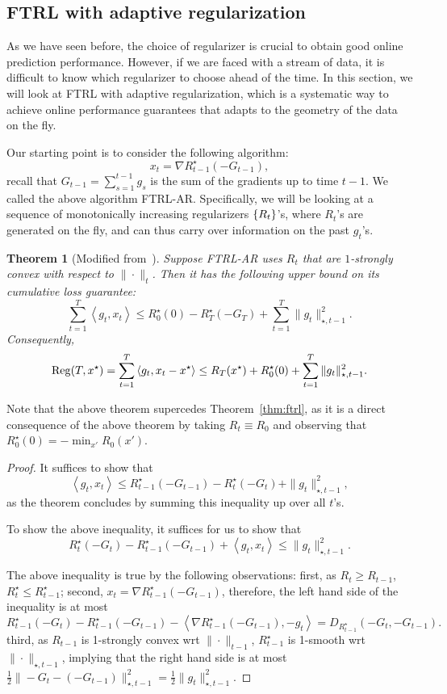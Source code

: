 \documentclass{article}
\newtheorem{theorem}{Theorem}
\DeclareMathOperator*{\Reg}{{\rm Reg}}
\newcommand{\inner}[2]{\left\langle #1,#2 \right\rangle}
\begin{document}
\subsection{FTRL with adaptive regularization}
As we have seen before, the choice of regularizer is crucial to obtain good online prediction performance. However, if we are faced with a stream of data, it is difficult to know which regularizer to choose ahead of the time.
In this section, we will look at FTRL with adaptive regularization, which is a systematic way to achieve online performance guarantees that adapts to the geometry of the data on the fly.

Our starting point is to consider the following algorithm:
\[ x_t = \nabla R_{t-1}^\star(-G_{t-1}), \]
recall that $G_{t-1} = \sum_{s=1}^{t-1} g_s$ is the sum of the gradients up to time $t-1$.
We called the above algorithm FTRL-AR.
Specifically, we will be looking at a sequence of monotonically increasing regularizers $\cbr{R_t}$'s, where $R_t$'s are generated on the fly, and can thus carry over information on the past $g_t$'s.

\begin{theorem}[Modified from~\cite{orabona2015generalized}]
Suppose FTRL-AR uses $R_t$ that are $1$-strongly convex with respect to $\| \cdot \|_{t}$.
Then it has the following upper bound on its cumulative loss guarantee:
\[ \sum_{t=1}^T \inner{g_t}{x_t} \leq R_0^\star(0) - R_T^\star(-G_T) + \sum_{t=1}^T \| g_t \|_{\star, t-1}^2. \]
Consequently,
\[ \Reg(T, x^\star) = \sum_{t=1}^T \inner{g_t}{x_t - x^\star} \leq R_T(x^\star) + R_0^\star(0) + \sum_{t=1}^T \| g_t \|_{\star, t-1}^2. \]
\end{theorem}

Note that the above theorem supercedes Theorem~\ref{thm:ftrl}, as it is a direct consequence of the above theorem by taking $R_t \equiv R_0$ and observing that $R_0^\star(0) = -\min_{x'} R_0(x')$.

\begin{proof}
It suffices to show that
\[ \inner{g_t}{x_t} \leq R_{t-1}^\star(-G_{t-1}) - R_t^\star(-G_t) + \| g_t \|_{\star, t-1}^2, \]
as the theorem concludes by summing this inequality up over all $t$'s.

To show the above inequality, it suffices for us to show that
\[ R_t^\star(-G_t) - R_{t-1}^\star(-G_{t-1}) + \inner{g_t}{x_t} \leq \| g_t \|_{\star, t-1}^2. \]

The above inequality is true by the following observations: first, as $R_t \geq R_{t-1}$, $R_t^\star \leq R_{t-1}^\star$; second, $x_t = \nabla R_{t-1}^\star(-G_{t-1})$, therefore,
the left hand side of the inequality is at most
\[ R_{t-1}^\star(-G_t) - R_{t-1}^\star(-G_{t-1}) - \inner{\nabla R_{t-1}^\star(-G_{t-1})}{-g_t} = D_{R_{t-1}^\star}(-G_t, -G_{t-1}). \]
third, as $R_{t-1}$ is 1-strongly convex wrt $\| \cdot \|_{t-1}$, $R_{t-1}^\star$ is 1-smooth wrt $\| \cdot \|_{\star, t-1}$, implying that the right hand side is at most $\frac12 \| -G_t - (-G_{t-1}) \|_{\star, t-1}^2 = \frac12 \| g_t \|_{\star, t-1}^2$.
\end{proof}
\end{document}
